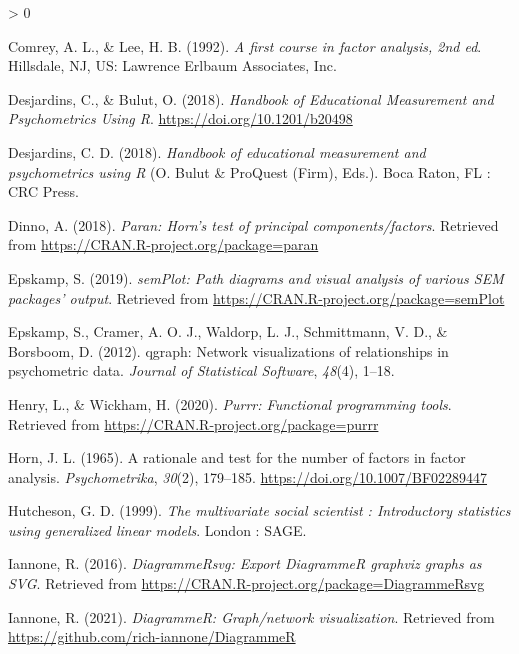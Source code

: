 \documentclass[
  english,
  man]{apa6}
\newlength{\cslhangindent}
\newenvironment{CSLReferences}[2] %
 {%
  \setlength{\parindent}{0pt}
  \ifodd #1 \everypar{\setlength{\hangindent}{\cslhangindent}}\ignorespaces\fi
  \ifnum #2 > 0
  \setlength{\parskip}{#2\baselineskip}
  \fi
 }%
 {}
\begin{document}
\begin{CSLReferences}{1}{0}
\leavevmode\hypertarget{ref-comreyFirstCourseFactor1992}{}%
Comrey, A. L., \& Lee, H. B. (1992). \emph{A first course in factor analysis, 2nd ed}. {Hillsdale, NJ, US}: {Lawrence Erlbaum Associates, Inc}.

\leavevmode\hypertarget{ref-desjardinsHandbookEducationalMeasurement2018}{}%
Desjardins, C., \& Bulut, O. (2018). \emph{Handbook of {Educational Measurement} and {Psychometrics Using R}}. \url{https://doi.org/10.1201/b20498}

\leavevmode\hypertarget{ref-desjardinsHandbookEducationalMeasurement2018a}{}%
Desjardins, C. D. (2018). \emph{Handbook of educational measurement and psychometrics using {R}} (O. Bulut \& ProQuest (Firm), Eds.). {Boca Raton, FL : CRC Press}.

\leavevmode\hypertarget{ref-R-paran}{}%
Dinno, A. (2018). \emph{Paran: Horn's test of principal components/factors}. Retrieved from \url{https://CRAN.R-project.org/package=paran}

\leavevmode\hypertarget{ref-R-semPlot}{}%
Epskamp, S. (2019). \emph{semPlot: Path diagrams and visual analysis of various SEM packages' output}. Retrieved from \url{https://CRAN.R-project.org/package=semPlot}

\leavevmode\hypertarget{ref-R-qgraph}{}%
Epskamp, S., Cramer, A. O. J., Waldorp, L. J., Schmittmann, V. D., \& Borsboom, D. (2012). {qgraph}: Network visualizations of relationships in psychometric data. \emph{Journal of Statistical Software}, \emph{48}(4), 1--18.

\leavevmode\hypertarget{ref-R-purrr}{}%
Henry, L., \& Wickham, H. (2020). \emph{Purrr: Functional programming tools}. Retrieved from \url{https://CRAN.R-project.org/package=purrr}

\leavevmode\hypertarget{ref-hornRationaleTestNumber1965}{}%
Horn, J. L. (1965). A rationale and test for the number of factors in factor analysis. \emph{Psychometrika}, \emph{30}(2), 179--185. \url{https://doi.org/10.1007/BF02289447}

\leavevmode\hypertarget{ref-hutchesonMultivariateSocialScientist1999}{}%
Hutcheson, G. D. (1999). \emph{The multivariate social scientist : Introductory statistics using generalized linear models}. {London : SAGE}.

\leavevmode\hypertarget{ref-R-DiagrammeRsvg}{}%
Iannone, R. (2016). \emph{DiagrammeRsvg: Export DiagrammeR graphviz graphs as SVG}. Retrieved from \url{https://CRAN.R-project.org/package=DiagrammeRsvg}

\leavevmode\hypertarget{ref-R-DiagrammeR}{}%
Iannone, R. (2021). \emph{DiagrammeR: Graph/network visualization}. Retrieved from \url{https://github.com/rich-iannone/DiagrammeR}


\end{CSLReferences}
\end{document}
